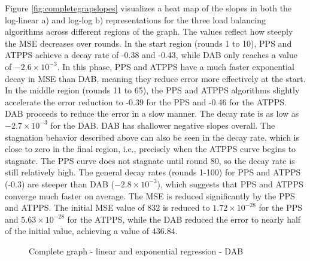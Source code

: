 Figure \ref{fig:completegrapslopes} visualizes a heat map of the slopes in both the log-linear a) and log-log b) representations for the three load balancing algorithms across different regions of the graph. The values reflect how steeply the MSE decreases over rounds. In the start region (rounds 1 to 10), PPS and ATPPS achieve a decay rate of -0.38 and -0.43, while DAB only reaches a value of $-2.6 \times 10^{-3}$. In this phase, PPS and ATPPS have a much faster exponential decay in MSE than DAB, meaning they reduce error more effectively at the start. In the middle region (rounds 11 to 65), the PPS and ATPPS algorithms slightly accelerate the error reduction to -0.39 for the PPS and -0.46 for the ATPPS. DAB proceeds to reduce the error in a slow manner. The decay rate is as low as $-2.7 \times 10^{-3}$ for the DAB. DAB has shallower negative slopes overall. The stagnation behavior described above can also be seen in the decay rate, which is close to zero in the final region, i.e., precisely when the ATPPS curve begins to stagnate. The PPS curve does not stagnate until round 80, so the decay rate is still relatively high. The general decay rates (rounds 1-100) for PPS and ATPPS (-0.3) are steeper than DAB ($-2.8 \times 10^{-3}$), which suggests that PPS and ATPPS converge much faster on average. The MSE is reduced significantly by the PPS and ATPPS. The initial MSE value of $832$ is reduced to $1.72 \times 10^{-28}$ for the PPS and $5.63 \times 10^{-28}$ for the ATPPS, while the DAB reduced the error to nearly half of the initial value, achieving a value of $436.84$.

\begin{figure}[!ht]
    \centering
    \hfil
    \caption{Complete graph - linear and exponential regression - DAB}
        \label{fig:dabCompleteModelFit}
\end{figure}

